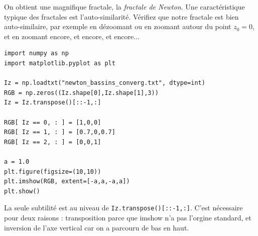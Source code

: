 \documentclass{book}
\begin{document}
On obtient une magnifique fractale, la \emph{fractale de Newton}. Une caractéristique typique des fractales est l'auto-similarité. Vérifiez que notre fractale est bien auto-similaire, par exemple en dézoomant ou en zoomant autour du point $z_0=0$, et en zoomant encore, et encore, et encore...

\begin{correction}
\begin{verbatim}
import numpy as np
import matplotlib.pyplot as plt

Iz = np.loadtxt("newton_bassins_converg.txt", dtype=int)
RGB = np.zeros((Iz.shape[0],Iz.shape[1],3))
Iz = Iz.transpose()[::-1,:]

RGB[ Iz == 0, : ] = [1,0,0]
RGB[ Iz == 1, : ] = [0.7,0,0.7]
RGB[ Iz == 2, : ] = [0,0,1]

a = 1.0
plt.figure(figsize=(10,10))
plt.imshow(RGB, extent=[-a,a,-a,a])
plt.show()
\end{verbatim}

La seule subtilité est au niveau de \texttt{Iz.transpose()[::-1,:]}. C'est nécessaire pour deux raisons : transposition parce que imshow n'a pas l'orgine standard, et inversion de l'axe vertical car on a parcouru de bas en haut.\\


\end{correction}
\end{document}
